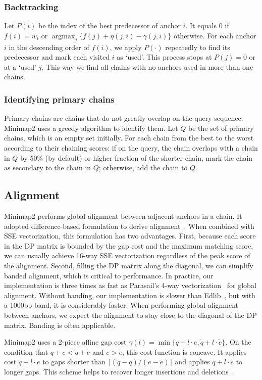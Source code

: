 \documentclass{bioinfo}
\DeclareMathOperator*{\argmax}{argmax}
\begin{document}
\begin{methods}
\subsubsection{Backtracking}
Let $P(i)$ be the index of the best predecessor of anchor $i$. It equals 0 if
$f(i)=w_i$ or $\argmax_j\{f(j)+\eta(j,i)-\gamma(j,i)\}$ otherwise. For each
anchor $i$ in the descending order of $f(i)$, we apply $P(\cdot)$ repeatedly to
find its predecessor and mark each visited $i$ as `used'. This process stops at
$P(j)=0$ or at a `used' $j$. This way we find all chains with no anchors used
in more than one chains.

\subsubsection{Identifying primary chains}
Primary chains are chains that do not greatly overlap on the query sequence.
Minimap2 uses a greedy algorithm to identify them. Let $Q$ be the set of
primary chains, which is an empty set initially. For each chain from the best
to the worst according to their chaining scores: if on the query, the chain
overlaps with a chain in $Q$ by 50\% (by default) or higher fraction of the
shorter chain, mark the chain as secondary to the chain in $Q$; otherwise, add
the chain to $Q$.

\subsection{Alignment}

Minimap2 performs global alignment between adjacent anchors in a chain. It
adopted difference-based formulation to derive
alignment~\citep{Wu:1996aa,Suzuki:2016}. When combined with SSE vectorization,
this formulation has two advantages. First, because each score in the DP matrix
is bounded by the gap cost and the maximum matching score, we can usually
achieve 16-way SSE vectorization regardless of the peak score of the
alignment. Second, filling the DP matrix along the diagonal, we can simplify
banded alignment, which is critical to performance. In practice, our
implementation is three times as fast as Parasail's 4-way
vectorization~\citep{Daily:2016aa} for global alignment.
Without banding, our implementation is slower than Edlib~\citep{Sosic:2017aa},
but with a 1000bp band, it is considerably faster. When performing global
alignment between anchors, we expect the alignment to stay close to the
diagonal of the DP matrix. Banding is often applicable.

Minimap2 uses a 2-piece affine gap cost
$\gamma(l)=\min\{q+l\cdot e,\tilde{q}+l\cdot\tilde{e}\}$.
On the condition that $q+e<\tilde{q}+\tilde{e}$ and $e>\tilde{e}$, this
cost function is concave. It applies cost $q+l\cdot e$ to gaps shorter than
$\lceil(\tilde{q}-q)/(e-\tilde{e})\rceil$ and applies
$\tilde{q}+l\cdot\tilde{e}$ to longer gaps. This scheme helps to recover
longer insertions and deletions~\citep{Gotoh:1990aa}.


\end{methods}
\end{document}
